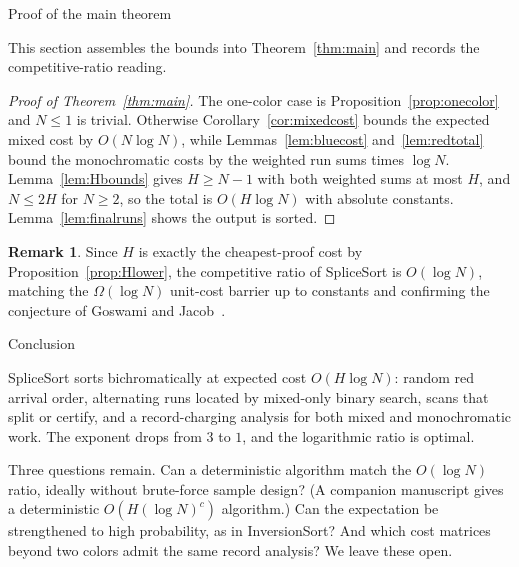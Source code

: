 \documentclass[11pt]{article}
\theoremstyle{definition}
\newtheorem{rem}[thm]{Remark}
\numberwithin{equation}{section}
\begin{document}
\begin{section}{Proof of the main theorem}
\begin{aiblock}
This section assembles the bounds into Theorem~\ref{thm:main} and
records the competitive-ratio reading.
\begin{proof}[Proof of Theorem~\ref{thm:main}]
The one-color case is Proposition~\ref{prop:onecolor} and
$N \le 1$ is trivial. Otherwise
Corollary~\ref{cor:mixedcost} bounds the expected mixed cost by
$O(N \log N)$, while Lemmas~\ref{lem:bluecost} and~\ref{lem:redtotal}
bound the monochromatic costs by the weighted run sums times
$\log N$. Lemma~\ref{lem:Hbounds} gives $H \ge N-1$ with both
weighted sums at most $H$, and $N \le 2H$ for $N \ge 2$, so the
total is $O(H \log N)$ with absolute constants.
Lemma~\ref{lem:finalruns} shows the output is sorted.
\end{proof}

\begin{rem}
Since $H$ is exactly the cheapest-proof cost by
Proposition~\ref{prop:Hlower}, the competitive ratio of
{\ttfamily SpliceSort} is $O(\log N)$, matching the $\Omega(\log N)$
unit-cost barrier up to constants and confirming the conjecture of
Goswami and Jacob~\cite{goswami2024bichromatic}.
\end{rem}
\end{aiblock}
\end{section}

\begin{section}{Conclusion}
\begin{aiblock}
{\ttfamily SpliceSort} sorts bichromatically at expected cost
$O(H \log N)$: random red arrival order, alternating runs located
by mixed-only binary search, scans that split or certify, and a
record-charging analysis for both mixed and monochromatic work.
The exponent drops from $3$ to $1$, and the logarithmic ratio is
optimal.

Three questions remain. Can a deterministic algorithm match the
$O(\log N)$ ratio, ideally without brute-force sample design?
(A companion manuscript gives a deterministic $O(H(\log N)^c)$
algorithm.) Can the expectation be strengthened to high
probability, as in {\ttfamily InversionSort}? And which cost matrices
beyond two colors admit the same record analysis? We leave these
open.
\end{aiblock}
\end{section}



\end{document}
